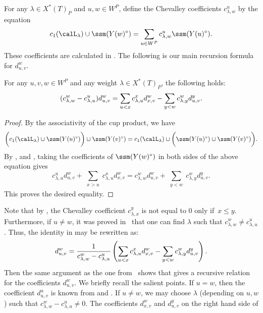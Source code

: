 For any $\lambda\in X^*(T)_P$ and $u,w\in W^P$, define the Chevalley coefficients $c^u_{\lambda,w}$ by the equation
\begin{equation}\label{equ:ccoeff}
	c_1(\calL_\lambda)\cup \ssm (Y(w)^\circ)=
	\sum_{u\in W^P} c_{\lambda,w}^{u} \ssm (Y(u)^\circ).
\end{equation}
These coefficients are calculated in . The following is 
our main recursion formula for $d_{u,v}^w$.
\begin{prop}
	\label{lem:recLR}
	For any $u,v,w\in W^P$ and any weight $\lambda\in X^*(T)_P$, 
	the following holds:
	$$
	(c^w_{\lambda,w} - c^u_{\lambda,u}) d^w_{u,v}=
	\sum_{\substack{u< x}} 
	c^x_{\lambda,u}d^w_{x,v}-\sum_{\substack{ y<w}} c^w_{\lambda,y} d^y_{u,v} \/.
	$$
\end{prop}
\begin{proof}
	By the associativity of the cup product, we have
	\[
	\bigg( c_1(\calL_\lambda) \cup \ssm({Y(u)^\circ}) \bigg)\cup \ssm({Y(v)^\circ})
	=c_1(\calL_\lambda) \cup \bigg( \ssm({Y(u)^\circ})\cup \ssm({Y(v)^\circ}) \bigg).
	\]
	By ,  and ,
	taking the coefficients of $\ssm({Y(w)^\circ})$ in both sides of the above equation gives
	$$c^u_{\lambda,u} d^w_{u,v}+\sum_{\substack{x > u}}
	c^x_{\lambda,u} d^w_{x,v}=
	c^w_{\lambda,w} d^w_{u,v}+\sum_{\substack{y< w}}
	c^w_{\lambda,y} d^y_{u,v}.$$
	This proves the desired equality.
\end{proof}
Note that by , the Chevalley coefficient $c_{\lambda, x}^{y}$ is not equal to $0$ 
only if~$x \le y$.
Furthermore, if $u \neq w$, it was proved in~\cite[Proposition A.3]{mihalcea:eqqhom} that
one can find $\lambda$ such that $c^w_{\lambda,w} \neq c^u_{\lambda,u}$.
Thus, the identity in  may be rewritten as:
\begin{equation}
	\label{eq:recLR}
	d^w_{u,v}=\frac{ 1 }{ c^w_{\lambda,w} - c^u_{\lambda,u}}\left( \sum_{\substack{ u < x}} 
	c^x_{\lambda,u}d^w_{x,v} -\sum_{\substack{ y < w}} c^w_{\lambda,y} d^y_{u,v}\right) \/.
\end{equation}
Then the same argument as the one from~\cite{mihalcea:eqqhom} shows that 
 gives a recursive relation for the 
coefficients $d_{u,v}^w$. We briefly recall the salient points. 
If $u=w$, then the coefficient $d_{u,v}^u$ is known from 
 and . If
$u \neq w$, we may choose $\lambda$ (depending on $u,w$) such that
$c^w_{\lambda,w} - c^u_{\lambda,u} \neq 0$. The
coefficients $d_{x,v}^w$ and $d_{u,v}^y$ on the right hand side of
